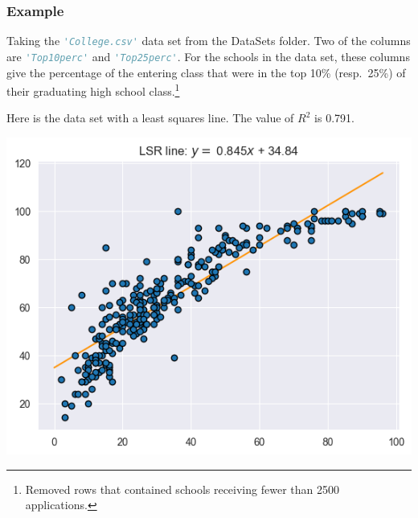 \documentclass{beamer}
\theoremstyle{example}
\begin{document}
\begin{frame}
\frametitle{Example}
Taking the \lstinline[language=Python, stringstyle=\ttfamily\color{strings}]{'College.csv'} data set from the DataSets folder. Two of the columns are \lstinline[language=Python, stringstyle=\ttfamily\color{strings}]{'Top10perc'} and \lstinline[language=Python, stringstyle=\ttfamily\color{strings}]{'Top25perc'}. For the schools in the data set, these columns give the percentage of the entering class that were in the top 10\% (resp.\ 25\%) of their graduating high school class.\footnote{Removed rows that contained schools receiving fewer than 2500 applications.}
    

\pause
Here is the data set with a least squares line. The value of $R^2$ is 0.791. 
\begin{center}
    \includegraphics[height=0.35\textheight]{../../Images/CollegeTop25ontoTop10_deg1.png}
\end{center}

\end{frame}
\end{document}
